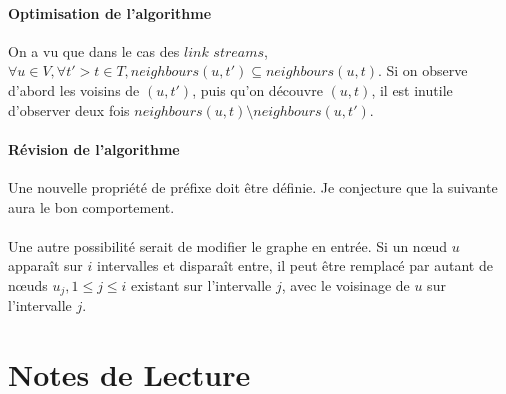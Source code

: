 \documentclass[12pt,a4paper]{article}
\begin{document}
\paragraph{Optimisation de l'algorithme} On a vu que dans le cas des
\(\textit{link streams}\),
\(\forall u \in V, \forall t' > t \in T, neighbours(u, t') \subseteq
neighbours(u, t)\). Si on observe d'abord les voisins de \((u, t')\),
puis qu'on découvre \((u, t)\), il est inutile d'observer deux fois
\(neighbours(u, t) \setminus neighbours(u, t')\).

\paragraph{Révision de l'algorithme}
Une nouvelle propriété de préfixe doit être définie. Je conjecture que
la suivante aura le bon comportement.\\
\noindent
{}\\

Une autre possibilité serait de modifier le graphe en entrée. Si un
nœud \(u\) apparaît sur \(i\) intervalles et disparaît entre, il peut
être remplacé par autant de nœuds \(u_j, 1 \leq j \leq i\) existant
sur l'intervalle \(j\), avec le voisinage de \(u\) sur l'intervalle
\(j\).

\section{Notes de Lecture}
\end{document}
